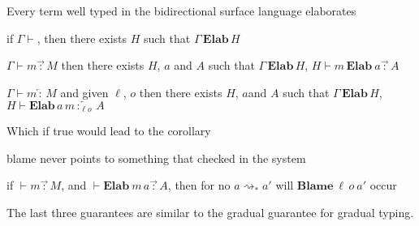 \begin{conjecture}
Every term well typed in the bidirectional surface language elaborates 

if $\Gamma\vdash$, then there exists $H$ such that $\Gamma\,\textbf{Elab}\,H$ 

$\Gamma\vdash m\overrightarrow{\,:\,}M$ then there exists $H$, $a$ and $A$ such that $\Gamma\,\textbf{Elab}\,H$, $H\vdash m\,\textbf{Elab}\ a\overrightarrow{\,:\,}A$ 

$\Gamma\vdash m\overleftarrow{\,:\,}M$ and given $\ell$, $o$ then there exists $H$, $a$and $A$ such that $\Gamma\,\textbf{Elab}\,H$, $H\vdash\textbf{Elab}\,a\,m\overleftarrow{\,:_{\ell o}\,}A$ 
\end{conjecture}

Which if true would lead to the corollary
\begin{conjecture}
blame never points to something that checked in the \bidir{} system 

if $\vdash m\overrightarrow{\,:\,}M$, and $\vdash\textbf{Elab}\ m\,a\overrightarrow{\,:\,}A$, then for no $a\rightsquigarrow_{*}a'$ will $\textbf{Blame}\:\ensuremath{\ell}\,o\:a'$ occur 

\end{conjecture}

The last three guarantees are similar to the gradual guarantee \cite{siek_et_al:LIPIcs:2015:5031} for gradual typing. 